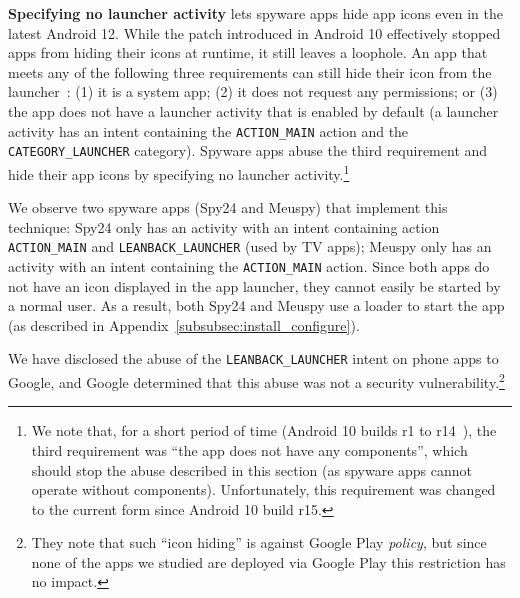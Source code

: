 \documentclass[sigconf,balance=false]{acmart}
\newcommand{\alex}[1]{\textcolor{chicagomaroon}{\noindent[AL: #1]}}
\newcommand{\geoff}[1]{\textcolor{purple}{\noindent[GV: #1]}}
\newcommand{\alex}[1]{}
\newcommand{\geoff}[1]{}
\begin{document}

\textbf{Specifying no launcher activity} lets spyware apps hide app
icons even in the latest Android 12. While the patch introduced in
Android 10 effectively stopped apps from hiding their icons at
runtime, it still leaves a loophole. An app that meets any of the
following three requirements can still hide their icon from the
launcher~\cite{Launcher79:online}: (1) it is a system app; (2) it does
not request any permissions; or (3) the app does not have a launcher
activity that is enabled by default (a launcher activity has an intent
containing the \texttt{ACTION\_MAIN} action and the
\texttt{CATEGORY\_LAUNCHER} category). Spyware apps abuse the third
requirement and hide their app icons by specifying no launcher
activity.\footnote{We note that, for a short period of time (Android 10 builds r1 to r14~\cite{Launcher48:online}), the third requirement was ``the app does not have any components'', which should stop the abuse described in this section (as spyware apps cannot operate without components). Unfortunately, this requirement was changed to the current form since Android 10 build r15.\label{footnote:hide_icon}}

We observe two spyware apps (Spy24 and Meuspy) that implement this
technique: Spy24 only has an activity with an intent containing action
\texttt{ACTION\_MAIN} and \texttt{LEANBACK\_LAUNCHER} (used by TV
apps); Meuspy only has an activity with an intent containing
the \texttt{ACTION\_MAIN} action.
Since both apps do not have an icon displayed in the app launcher,
they cannot easily be started by a normal user.  As a result, both
Spy24 and Meuspy use a loader to start the app (as described in
Appendix~\ref{subsubsec:install_configure}).

We have disclosed the abuse of the \texttt{LEANBACK\_LAUNCHER} intent
on phone apps to Google, and Google determined that
this abuse was not a security vulnerability.\footnote{They note that such ``icon hiding'' is against Google Play \emph{policy}, but since none of the apps we studied are deployed via Google Play this restriction has no impact.}
\end{document}
